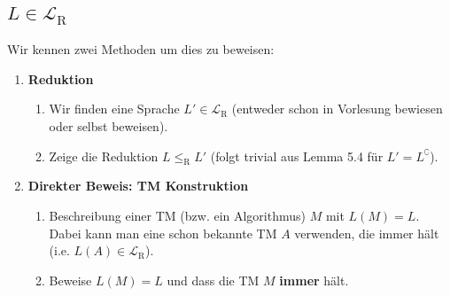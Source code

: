 \documentclass[a4paper, 11pt]{article}
\def\L{\mathcal{L}}
\def\Lr{\mathcal{L}_\text{R}}
\begin{document}
                    \subsection{$L \in \Lr$ }
                        Wir kennen zwei Methoden um dies zu beweisen:
                        \begin{enumerate}[label=\Roman*.]
                            \item \textbf{Reduktion}
                            \begin{enumerate}[label = (\alph*)]
                                \item Wir finden eine Sprache $L' \in \L_\text{R}$ (entweder schon in Vorlesung bewiesen oder selbst beweisen).
                                \item  Zeige die Reduktion $L \leq_{\text{R}} L'$ (folgt trivial aus Lemma 5.4 für $L' = L^\complement$).
                            \end{enumerate}
                                \item \textbf{Direkter Beweis: TM Konstruktion}
                                \begin{enumerate}[label=(\alph*)]
                                    \item Beschreibung einer TM (bzw. ein Algorithmus) $M$ mit $L(M) = L$. Dabei kann man eine schon bekannte TM $A$ verwenden, die immer hält (i.e. $L(A) \in \Lr$).
                                    \item Beweise $L(M) = L$ und dass die TM $M$ \textbf{immer} hält.
                                \end{enumerate}
                        \end{enumerate}
                
                
                
\end{document}
